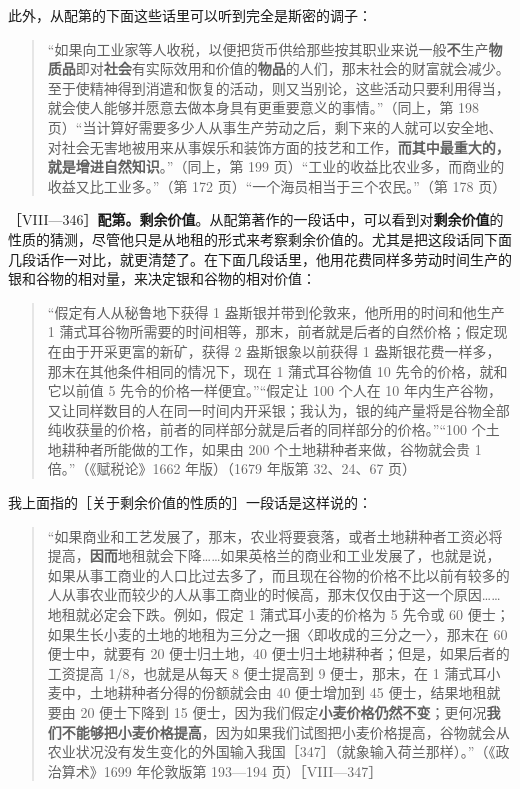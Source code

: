 此外，从配第的下面这些话里可以听到完全是斯密的调子：

\begin{quote}“如果向工业家等人收税，以便把货币供给那些按其职业来说一般\textbf{不}生产\textbf{物质品}即对\textbf{社会}有实际效用和价值的\textbf{物品}的人们，那末社会的财富就会减少。至于使精神得到消遣和恢复的活动，则又当别论，这些活动只要利用得当，就会使人能够并愿意去做本身具有更重要意义的事情。”（同上，第 198 页）“当计算好需要多少人从事生产劳动之后，剩下来的人就可以安全地、对社会无害地被用来从事娱乐和装饰方面的技艺和工作，\textbf{而其中最重大的，就是增进自然知识}。”（同上，第 199 页）“工业的收益比农业多，而商业的收益又比工业多。”（第 172 页）“一个海员相当于三个农民。”（第 178 页）\end{quote}


［VIII—346］\textbf{配第。剩余价值}。从配第著作的一段话中，可以看到对\textbf{剩余价值}的性质的猜测，尽管他只是从地租的形式来考察剩余价值的。尤其是把这段话同下面几段话作一对比，就更清楚了。在下面几段话里，他用花费同样多劳动时间生产的银和谷物的相对量，来决定银和谷物的相对价值：

\begin{quote}“假定有人从秘鲁地下获得 1 盎斯银并带到伦敦来，他所用的时间和他生产 1 蒲式耳谷物所需要的时间相等，那末，前者就是后者的自然价格；假定现在由于开采更富的新矿，获得 2 盎斯银象以前获得 1 盎斯银花费一样多，那末在其他条件相同的情况下，现在 1 蒲式耳谷物值 10 先令的价格，就和它以前值 5 先令的价格一样便宜。”“假定让 100 个人在 10 年内生产谷物，又让同样数目的人在同一时间内开采银；我认为，银的纯产量将是谷物全部纯收获量的价格，前者的同样部分就是后者的同样部分的价格。”“100 个土地耕种者所能做的工作，如果由 200 个土地耕种者来做，谷物就会贵 1 倍。”（《赋税论》1662 年版）（1679 年版第 32、24、67 页）\end{quote}

我上面指的［关于剩余价值的性质的］一段话是这样说的：

\begin{quote}“如果商业和工艺发展了，那末，农业将要衰落，或者土地耕种者工资必将提高，\textbf{因而}地租就会下降……如果英格兰的商业和工业发展了，也就是说，如果从事工商业的人口比过去多了，而且现在谷物的价格不比以前有较多的人从事农业而较少的人从事工商业的时候高，那末仅仅由于这一个原因……地租就必定会下跌。例如，假定 1 蒲式耳小麦的价格为 5 先令或 60 便士；如果生长小麦的土地的地租为三分之一捆〈即收成的三分之一〉，那末在 60 便士中，就要有 20 便士归土地，40 便士归土地耕种者；但是，如果后者的工资提高 1/8，也就是从每天 8 便士提高到 9 便士，那末，在 1 蒲式耳小麦中，土地耕种者分得的份额就会由 40 便士增加到 45 便士，结果地租就要由 20 便士下降到 15 便士，因为我们假定\textbf{小麦价格仍然不变}；更何况\textbf{我们不能够把小麦价格提高}，因为如果我们试图把小麦价格提高，谷物就会从农业状况没有发生变化的外国输入我国［347］（就象输入荷兰那样）。”（《政治算术》1699 年伦敦版第 193—194 页）［VIII—347］\end{quote}

